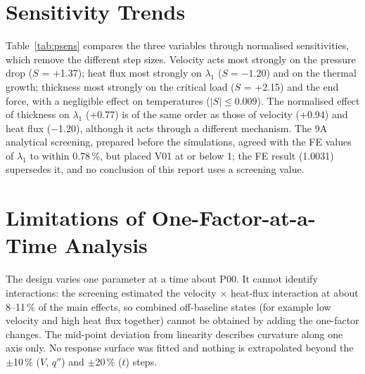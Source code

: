 

\section{Sensitivity Trends}
Table~\ref{tab:psens} compares the three variables through normalised sensitivities, which remove the different step sizes. Velocity acts
most strongly on the pressure drop ($S$ = +1.37); heat flux most strongly on $\lambda_1$ ($S = -1.20$) and on the thermal growth; thickness most
strongly on the critical load ($S$ = +2.15) and the end force, with a negligible effect on temperatures ($|S| \le 0.009$). The normalised effect
of thickness on $\lambda_1$ (+0.77) is of the same order as those of velocity (+0.94) and heat flux ($-$1.20), although it acts through a
different mechanism. The 9A analytical screening, prepared before the simulations, agreed with the FE values of $\lambda_1$ to within
0.78\,\%, but placed V01 at or below 1; the FE result (1.0031) supersedes it, and no conclusion of this report uses a screening value.



\section{Limitations of One-Factor-at-a-Time Analysis}
The design varies one parameter at a time about P00. It cannot identify interactions: the screening estimated the velocity $\times$ heat-flux
interaction at about 8--11\,\% of the main effects, so combined off-baseline states (for example low velocity and high heat flux together) cannot
be obtained by adding the one-factor changes. The mid-point deviation from linearity describes curvature along one axis only. No response
surface was fitted and nothing is extrapolated beyond the $\pm$10\,\% ($V$, $q''$) and $\pm$20\,\% ($t$) steps.

